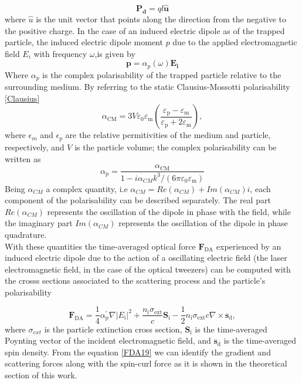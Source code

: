 \documentclass[letterpaper,12pt,oneside]{book}
\begin{document}
 \begin{equation}
     \mathbf{P_d} = ql \mathbf{\hat{u}}
 \end{equation}
 where $\hat{u}$ is the unit vector that points along the direction from the negative to the positive charge.
 In the case of an induced electric dipole as of the trapped particle, the induced electric dipole moment $p$ due to the applied electromagnetic field $E_i$ with frequency $\omega$,is given by
 \begin{equation}
 \mathbf{p} = \alpha_p(\omega) \mathbf{E_i}
\end{equation}
 Where $\alpha_p$ is the complex polarisability of the trapped particle relative to the surrounding medium. By referring to the static Clausius-Mossotti polarisability \eqref{Clausius}
\begin{equation}
\alpha_{\mathrm{CM}}=3 V \varepsilon_0 \varepsilon_{\mathrm{m}}\left(\frac{\varepsilon_{\mathrm{p}}-\varepsilon_{\mathrm{m}}}{\varepsilon_{\mathrm{p}}+2 \varepsilon_{\mathrm{m}}}\right),
\label{Clausius}
\end{equation}
\noindent where $\epsilon_m$ and $\epsilon_p$ are the relative permitivities of the medium and particle, respectively, and
$V$ is the particle volume; the complex polarisability can be written as
\begin{equation}
\alpha_{\mathrm{p}}=\frac{\alpha_{\mathrm{CM}}}{1-i \alpha_{C M} k^3 /\left(6 \pi \varepsilon_0 \varepsilon_{\mathrm{m}}\right)}
\end{equation}
Being $\alpha_{CM}$ a complex quantity, i.e $\alpha_{CM} = Re(\alpha_{CM}) + Im(\alpha_{CM})i $, each component of the polarisability can be described separately. The real part $Re(\alpha_{CM})$ represents the oscillation of the dipole in phase with the field, while the imaginary part $Im(\alpha_{CM})$ represents the oscillation of the dipole in phase quadrature.
 \\ With these quantities the time-averaged optical force $\mathbf{F}_{\mathrm{DA}}$ experienced by an induced electric dipole due to the action of a oscillating electric field (the laser electromagnetic field, in the case of the optical tweezers) can be computed with the crosss sections associated to the scattering process and the particle's polarisability

\begin{equation}
\mathbf{F}_{\mathrm{DA}}=\frac{1}{4} \alpha_{\mathrm{p}}^{\prime} \nabla\left|E_{\mathrm{i}}\right|^2+\frac{n_{\mathrm{i}} \sigma_{\mathrm{ext}}}{c} \mathbf{S}_{\mathrm{i}}-\frac{1}{2} n_{\mathrm{i}} \sigma_{\mathrm{ext}} c \nabla \times \mathbf{s}_{\mathrm{d}},
\label{FDA19}
\end{equation}
where $\sigma_{ext}$ is the particle extinction cross section, $\mathbf{S}_{\mathrm{i}}$ is the time-averaged Poynting vector of the incident electromagnetic field, and $\mathbf{s}_{\mathrm{d}}$ is the time-averaged spin density.
From the equation \eqref{FDA19} we can identify the gradient and scattering forces along with the spin-curl force as it is shown in the theoretical section of this work.
 
\end{document}
